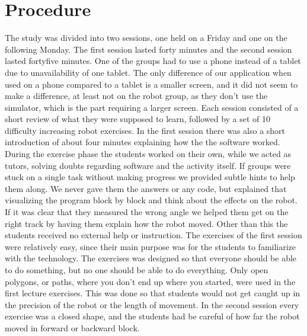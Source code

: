 \chapter{Procedure}
The study was divided into two sessions, one held on a Friday and one on the following Monday. The first session lasted forty minutes and the second session lasted fortyfive minutes. 
One of the groups had to use a phone instead of a tablet due to unavailability of one tablet. 
The only difference of our application when used on a phone compared to a tablet is a smaller screen, and it did not seem to make a difference, at least not on the robot group, as they don't use the simulator, which is the part requiring a larger screen. Each session consisted of a short review of what they were supposed to learn, followed by a set of 10 difficulty increasing robot exercises. In the first session there was also a short introduction of about four minutes explaining how the the software worked. During the exercise phase the students worked on their own, while we acted as tutors, solving doubts regarding software and the activity itself. If groups were stuck on a single task without making progress we provided subtle hints to help them along. 
We never gave them the answers or any code, but explained that visualizing the program block by block and think about the effects on the robot. If it was clear that they measured the wrong angle we helped them get on the right track by having them explain how the robot moved. 
Other than this the students received no external help or instruction. The exercises of the first session were relatively easy, since their main purpose was for the students to familiarize with the technology. The exercises was designed so that everyone should be able to do something, but no one should be able to do everything. Only open polygons, or paths, where you don't end up where you started, were used in the first lecture exercises. This was done so that students would not get caught up in the precision of the robot or the length of movement. In the second session every exercise was a closed shape, and the students had be careful of how far the robot moved in forward or backward block.  

